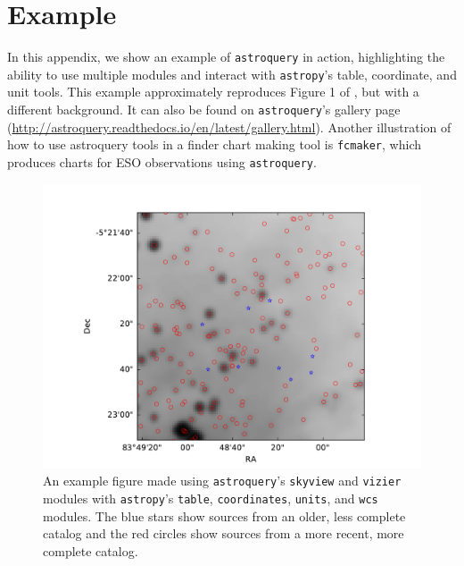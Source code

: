\documentclass[twocolumn]{aastex62}
\newcommand{\package}[1]{\texttt{#1}\xspace}
\newcommand{\astroquery}{\package{astroquery}}
\newcommand{\astropypkg}{\package{astropy}}
\begin{document}



\appendix
\section{Example}
\label{sec:example}
In this appendix, we show an example of \astroquery in action, highlighting the
ability to use multiple modules and interact with \astropypkg's table, coordinate,
and unit tools.  This example approximately reproduces Figure 1 of
\citet{Eisner2016a}, but with a different background.  It can also be found on
\astroquery's gallery page
(\url{http://astroquery.readthedocs.io/en/latest/gallery.html}).
Another illustration of how to use astroquery tools in a finder chart making
tool is \texttt{fcmaker}, which produces charts for ESO observations using
\astroquery \citep{Vogt2018a}.


\newpage



\begin{figure}[!htp]
\includegraphics[scale=1,width=7in]{example_figure_1.pdf}
\caption{An example figure made using \astroquery's \texttt{skyview} and
\texttt{vizier} modules with \astropypkg's \texttt{table}, \texttt{coordinates},
\texttt{units}, and \texttt{wcs} modules.  The blue stars show sources from
an older, less complete catalog and the red circles show sources from a more
recent, more complete catalog.
}
\label{fig:example1}
\end{figure}
\end{document}
